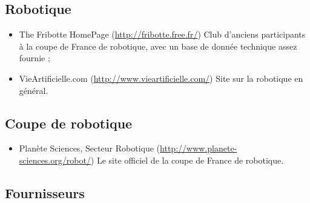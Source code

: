 \documentclass[a4paper]{article}
\begin{document}
\subsection{Robotique}

\begin{itemize}
	\item The Fribotte HomePage (\url{http://fribotte.free.fr/})
	\subitem Club d'anciens participants à la coupe de France de robotique, avec un base de donnée technique assez fournie ;
	\item VieArtificielle.com (\url{http://www.vieartificielle.com/})
	\subitem Site sur la robotique en général.
\end{itemize}

\subsection{Coupe de robotique}

\begin{itemize}
	\item Planète Sciences, Secteur Robotique (\url{http://www.planete-sciences.org/robot/})
	\subitem Le site officiel de la coupe de France de robotique.
\end{itemize}

\subsection{Fournisseurs}
\end{document}
